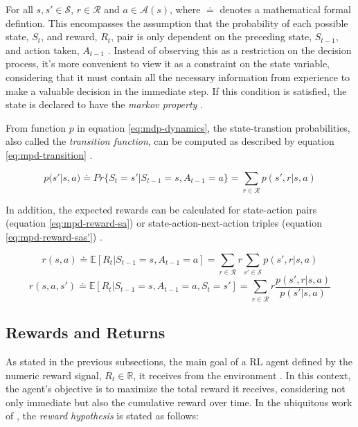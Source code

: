 For all $s, s' \in \mathcal{S}$, $r \in \mathcal{R}$ and $a \in \mathcal{A}(s)$, where $\doteq$ denotes a mathematical formal defintion. This encompasses the assumption that the probability of each possible state, $S_t$, and reward, $R_t$, pair is only dependent on the preceding state, $S_{t-1}$, and action taken, $A_{t-1}$ \cite{suttonReinforcementLearningIntroduction2014}. Instead of observing this as a restriction on the decision process, it's more convenient to view it as a constraint on the state variable, considering that it must contain all the necessary information from experience to make a valuable decision in the immediate step. If this condition is satisfied, the state is declared to have the \textit{markov property} \cite{suttonReinforcementLearningIntroduction2014}. \par
From function $p$ in equation \ref{eq:mdp-dynamics}, the state-transtion probabilities, also called the \textit{transition function}, can be computed as described by equation \ref{eq:mpd-transition} \cite{suttonReinforcementLearningIntroduction2014, moralesGrokkingDeepReinforcement2020}.

\begin{equation} \label{eq:mpd-transition}
	p(s'|s,a) \doteq Pr\{S_t = s'|S_{t-1} = s, A_{t-1} = a\} = \sum_{r \in \mathcal{R}} p(s',r|s,a)
\end{equation}

In addition, the expected rewards can be calculated for state-action pairs (equation \ref{eq:mpd-reward-sa}) or state-action-next-action triples (equation \ref{eq:mpd-reward-sas'}) \cite{suttonReinforcementLearningIntroduction2014, moralesGrokkingDeepReinforcement2020}.

\begin{equation} \label{eq:mpd-reward-sa}
	r(s,a) \doteq \mathbb{E}[R_t | S_{t-1} = s, A_{t-1} = a] = \sum_{r \in \mathcal{R}} r \sum_{s' \in \mathcal{S}} p(s', r|s,a)
\end{equation}
\begin{equation} \label{eq:mpd-reward-sas'}
	r(s,a,s') \doteq \mathbb{E}[R_t | S_{t-1} = s, A_{t-1} = a, S_t = s'] = \sum_{r \in \mathcal{R}} r \frac{p(s',r|s,a)}{p(s'|s,a)}
\end{equation}

\subsection{Rewards and Returns}

As stated in the previous subsections, the main goal of a \ac{RL} agent defined by the numeric reward signal, $R_t \in \mathbb{R}$, it receives from the environment \cite{suttonReinforcementLearningIntroduction2014}. In this context, the agent's objective is to maximize the total reward it receives, considering not only immediate but also the cumulative reward over time. In the ubiquitous work of \cite{suttonReinforcementLearningIntroduction2014}, the \textit{reward hypothesis} is stated as follows:

